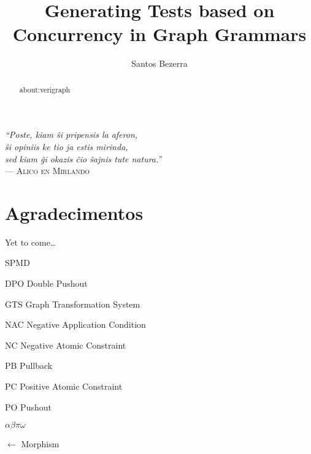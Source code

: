 \documentclass[ppgc,diss,english,openright]{iiufrgs}
\title{Generating Tests based on Concurrency in Graph Grammars}
\author{Santos Bezerra}{Jonas}
\theoremstyle{plain}
\theoremstyle{definition}
\begin{document}
  \maketitle
  \clearpage

  \clearpage
  \begin{flushright}
    \mbox{}\vfill
    {\sffamily\itshape
    ``Poste, kiam \^si pripensis la aferon,\\
    \^si opiniis ke tio ja estis mirinda,\\
    sed kiam \^gi okazis \^cio \^sajnis tute natura.''\\}
    --- \textsc{Alico en Mirlando}
  \end{flushright}

  \chapter*{Agradecimentos}
  Yet to come\ldots
  
  \begin{abstract}
    about:verigraph
  \end{abstract}

  \begin{listofabbrv}{SPMD}
          \item[DPO] Double Pushout
          \item[GTS] Graph Transformation System
          \item[NAC] Negative Application Condition
          \item[NC] Negative Atomic Constraint
          \item[PB] Pullback
          \item[PC] Positive Atomic Constraint
          \item[PO] Pushout
  \end{listofabbrv}

  \begin{listofsymbols}{$\alpha\beta\pi\omega$}
         \item[$\leftarrow$] Morphism
  \end{listofsymbols}

  \listoffigures
  \tableofcontents

  
  
  
  
  
  
  
  
\end{document}
